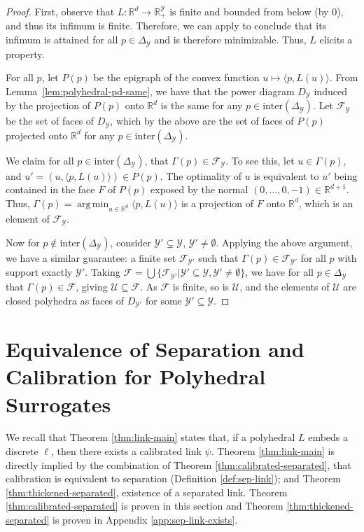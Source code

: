 \documentclass[twoside,11pt]{article}
\newcommand{\reals}{\mathbb{R}}
\newcommand{\simplex}{\Delta_\Y}
\newcommand{\F}{\mathcal{F}}
\newcommand{\U}{\mathcal{U}}
\newcommand{\Y}{\mathcal{Y}}
\newcommand{\inprod}[2]{\langle #1, #2 \rangle}%
\newcommand{\inter}{\mathrm{inter}}
\DeclareMathOperator*{\argmin}{arg\,min}
\begin{document}
\polyhedralrangegamma*
\begin{proof}
	First, observe that $L: \reals^d \to \reals^\Y_+$ is finite and bounded from below (by $0$), and thus its infimum is finite. 
	Therefore, we can apply \citet[Corollary 19.3.1]{rockafellar1997convex} to conclude that its infimum is attained for all $p \in \simplex$ and is therefore minimizable.
  Thus, $L$ elicits a property.
	
	For all $p$, let $P(p)$ be the epigraph of the convex function $u\mapsto \inprod{p}{L(u)}$.
	From Lemma~\ref{lem:polyhedral-pd-same}, we have that the power diagram $D_\Y$ induced by the projection of $P(p)$ onto $\reals^d$ is the same for any $p\in\inter(\simplex)$.
	Let $\F_\Y$ be the set of faces of $D_\Y$, which by the above are the set of faces of $P(p)$ projected onto $\reals^d$ for any $p\in\inter(\simplex)$.
	
	We claim for all $p\in\inter(\simplex)$, that $\Gamma(p) \in \F_\Y$.
	To see this, let $u \in \Gamma(p)$, and $u' = (u,\inprod{p}{L(u)}) \in P(p)$.
	The optimality of $u$ is equivalent to $u'$ being contained in the face $F$ of $P(p)$ exposed by the normal $(0,\ldots,0,-1)\in\reals^{d+1}$.
	Thus, $\Gamma(p) = \argmin_{u\in\reals^d} \inprod{p}{L(u)}$ is a projection of $F$ onto $\reals^d$, which is an element of $\F_\Y$.
	
	Now for $p \not \in \inter(\simplex)$, consider $\Y'\subsetneq \Y$, $\Y'\neq\emptyset$.
	Applying the above argument, we have a similar guarantee: a finite set $\F_{\Y'}$ such that $\Gamma(p) \in \F_{\Y'}$ for all $p$ with support exactly $\Y'$.
	Taking $\F = \bigcup\{\F_{\Y'} | \Y'\subseteq\Y, \Y'\neq\emptyset\}$, we have for all $p\in\simplex$ that $\Gamma(p) \in \F$, giving $\U \subseteq \F$.
	As $\F$ is finite, so is $\U$, and the elements of $\U$ are closed polyhedra as faces of $D_{\Y'}$ for some $\Y'\subseteq\Y$.
\end{proof}






\section{Equivalence of Separation and Calibration for Polyhedral Surrogates}
\label{sec:equiv-sep-calib}

We recall that Theorem \ref{thm:link-main} states that, if a polyhedral $L$ embeds a discrete $\ell$, then there exists a calibrated link $\psi$.
Theorem \ref{thm:link-main} is directly implied by the combination of Theorem \ref{thm:calibrated-separated}, that calibration is equivalent to separation (Definition \ref{def:sep-link}); and Theorem \ref{thm:thickened-separated}, existence of a separated link.
Theorem \ref{thm:calibrated-separated} is proven in this section and Theorem \ref{thm:thickened-separated} is proven in Appendix \ref{app:sep-link-exists}.
\end{document}
